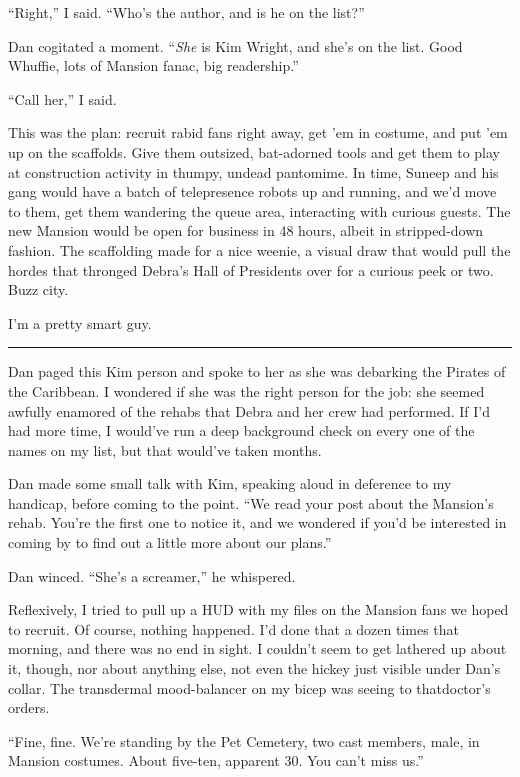 “Right,” I said. “Who's the author, and is he on the list?”

Dan cogitated a moment. “\emph{She} is Kim Wright, and she's on the
list. Good Whuffie, lots of Mansion fanac, big readership.”

“Call her,” I said.

This was the plan: recruit rabid fans right away, get 'em in
costume, and put 'em up on the scaffolds. Give them outsized,
bat-adorned tools and get them to play at construction activity in
thumpy, undead pantomime. In time, Suneep and his gang would have a
batch of telepresence robots up and running, and we'd move to them,
get them wandering the queue area, interacting with curious guests.
The new Mansion would be open for business in 48 hours, albeit in
stripped-down fashion. The scaffolding made for a nice weenie, a
visual draw that would pull the hordes that thronged Debra's Hall
of Presidents over for a curious peek or two. Buzz city.

I'm a pretty smart guy.

\begin{center}\rule{1in}{0.4pt}\end{center}

Dan paged this Kim person and spoke to her as she was debarking the
Pirates of the Caribbean. I wondered if she was the right person
for the job: she seemed awfully enamored of the rehabs that Debra
and her crew had performed. If I'd had more time, I would've run a
deep background check on every one of the names on my list, but
that would've taken months.

Dan made some small talk with Kim, speaking aloud in deference to
my handicap, before coming to the point. “We read your post about
the Mansion's rehab. You're the first one to notice it, and we
wondered if you'd be interested in coming by to find out a little
more about our plans.”

Dan winced. “She's a screamer,” he whispered.

Reflexively, I tried to pull up a HUD with my files on the Mansion
fans we hoped to recruit. Of course, nothing happened. I'd done
that a dozen times that morning, and there was no end in sight. I
couldn't seem to get lathered up about it, though, nor about
anything else, not even the hickey just visible under Dan's collar.
The transdermal mood-balancer on my bicep was seeing to
that{\dash}doctor's orders.

“Fine, fine. We're standing by the Pet Cemetery, two cast members,
male, in Mansion costumes. About five-ten, apparent 30. You can't
miss us.”

